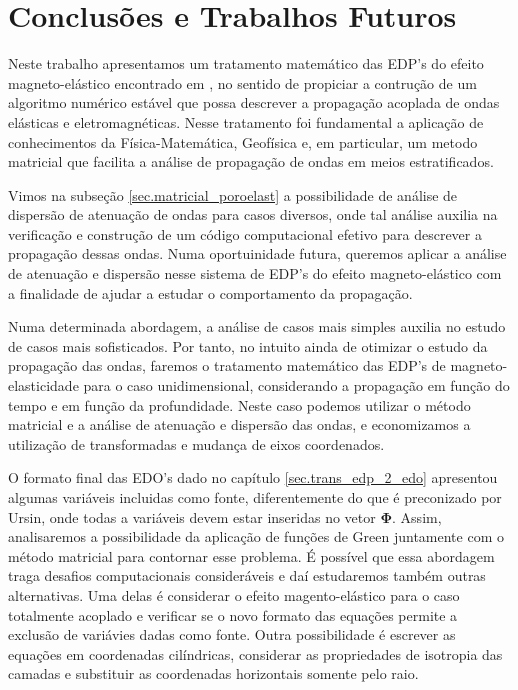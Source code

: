 \chapter{Conclus\~oes e Trabalhos Futuros}
Neste trabalho apresentamos um tratamento matem\'atico das EDP's do efeito magneto-el\'astico encontrado em \cite{pinho_2018} , no sentido de propiciar a contru\c{c}\~ao de um algoritmo num\'erico est\'avel que possa descrever a propaga\c{c}\~ao acoplada de ondas el\'asticas e eletromagn\'eticas. Nesse tratamento foi fundamental a aplica\c{c}\~ao de conhecimentos da F\'isica-Matem\'atica, Geof\'isica e, em particular, um metodo matricial que facilita a an\'alise de propaga\c{c}\~ao de ondas em meios estratificados.

Vimos na subse\c{c}\~ao \ref{sec.matricial_poroelast} a possibilidade de an\'alise de dispers\~ao de atenua\c{c}\~ao de ondas para casos diversos, onde tal an\'alise auxilia na verifica\c{c}\~ao e constru\c{c}\~ao de um c\'odigo computacional efetivo para descrever a propaga\c{c}\~ao dessas ondas. Numa oportuinidade futura, queremos aplicar a an\'alise de atenua\c{c}\~ao e dispers\~ao nesse sistema de EDP's do efeito magneto-el\'astico com a finalidade de ajudar a estudar o comportamento da propaga\c{c}\~ao.

Numa determinada abordagem, a an\'alise de casos mais simples auxilia no estudo de casos mais sofisticados. Por tanto, no intuito ainda de otimizar o estudo da propaga\c{c}\~ao das ondas, faremos o tratamento matem\'atico das EDP's de magneto-elasticidade para o caso unidimensional, considerando a propaga\c{c}\~ao em fun\c{c}\~ao do tempo e em fun\c{c}\~ao da profundidade. Neste caso podemos utilizar o m\'etodo matricial e a an\'alise de atenua\c{c}\~ao e dispers\~ao das ondas, e economizamos a utiliza\c{c}\~ao de transformadas e mudan\c{c}a de eixos coordenados.

O formato final das EDO's dado no cap\'itulo \ref{sec.trans_edp_2_edo} apresentou algumas vari\'aveis incluidas como fonte, diferentemente do que \'e preconizado por Ursin, onde todas a vari\'aveis devem estar inseridas no vetor $\mathbf{\Phi}$. Assim, analisaremos a possibilidade da aplica\c{c}\~ao de fun\c{c}\~oes de Green juntamente com o m\'etodo matricial para contornar esse problema. \'E poss\'ivel que essa abordagem traga desafios computacionais consider\'aveis e da\'i estudaremos tamb\'em outras alternativas. Uma delas \'e considerar o efeito magento-el\'astico para o caso totalmente acoplado e verificar se o novo formato das equa\c{c}\~oes permite a exclus\~ao de vari\'avies dadas como fonte. Outra possibilidade \'e escrever as equa\c{c}\~oes em coordenadas cil\'indricas, considerar as propriedades de isotropia das camadas e substituir as coordenadas horizontais somente pelo raio.

